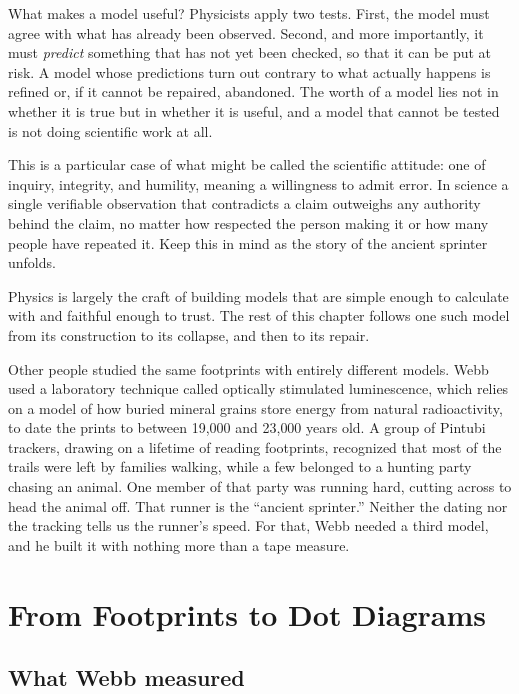 \documentclass[11pt,twoside,openany]{book}
\newcounter{check}[chapter]
\begin{document}
What makes a model useful? Physicists apply two tests. First, the model must agree with what has already been observed. Second, and more importantly, it must \emph{predict} something that has not yet been checked, so that it can be put at risk. A model whose predictions turn out contrary to what actually happens is refined or, if it cannot be repaired, abandoned. The worth of a model lies not in whether it is true but in whether it is useful, and a model that cannot be tested is not doing scientific work at all.

This is a particular case of what might be called the scientific attitude: one of inquiry, integrity, and humility, meaning a willingness to admit error. In science a single verifiable observation that contradicts a claim outweighs any authority behind the claim, no matter how respected the person making it or how many people have repeated it. Keep this in mind as the story of the ancient sprinter unfolds.

Physics is largely the craft of building models that are simple enough to calculate with and faithful enough to trust. The rest of this chapter follows one such model from its construction to its collapse, and then to its repair.

\begin{modelnote}
Other people studied the same footprints with entirely different models. Webb used a laboratory technique called optically stimulated luminescence, which relies on a model of how buried mineral grains store energy from natural radioactivity, to date the prints to between 19{,}000 and 23{,}000 years old. A group of Pintubi trackers, drawing on a lifetime of reading footprints, recognized that most of the trails were left by families walking, while a few belonged to a hunting party chasing an animal. One member of that party was running hard, cutting across to head the animal off. That runner is the ``ancient sprinter.'' Neither the dating nor the tracking tells us the runner's speed. For that, Webb needed a third model, and he built it with nothing more than a tape measure.
\end{modelnote}

\section{From Footprints to Dot Diagrams}

\subsection{What Webb measured}
\end{document}
